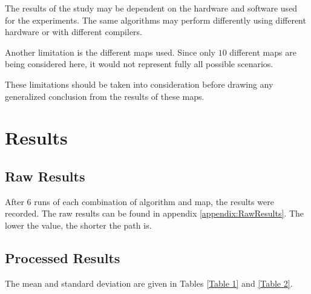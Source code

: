 \documentclass{article}
\begin{document}
\noindent
The results of the study may be dependent on the hardware and software used for the experiments. The same algorithms may perform differently using different hardware or with different compilers.

\noindent
Another limitation is the different maps used. Since only $10$ different maps are being considered here, it would not represent fully all possible scenarios. 

\noindent
These limitations should be taken into consideration before drawing any generalized conclusion from the results of these maps.


\section{Results}\label{Results}
\subsection{Raw Results}
After 6 runs of each combination of algorithm and map, the results were recorded. The raw results can be found in appendix \ref{appendix:RawResults}. The lower the value, the shorter the path is.


\subsection{Processed Results}

The mean and standard deviation are given in Tables \ref{Table 1} and \ref{Table 2}.
\end{document}
